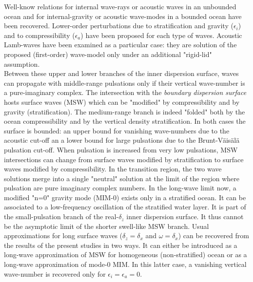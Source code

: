 \documentclass[a4paper,11pt]{article}
\begin{document}
Well-know relations for internal wave-rays or acoustic waves in an unbounded ocean and for internal-gravity or acoustic wave-modes in a bounded ocean have been recovered. Lower-order perturbations due to stratification and gravity ($\epsilon_i$) and to compressibility ($\epsilon_a$) have been proposed for each type of waves. Acoustic Lamb-waves have been examined as a particular case: they are solution of the proposed (first-order) wave-model only under an additional "rigid-lid" assumption.\\

Between these upper and lower branches of the inner dispersion surface, waves can propagate with middle-range pulsations only if their vertical wave-number is a pure-imaginary complex. The intersection with the \textit{boundary dispersion surface} hosts surface waves (MSW) which can be "modified" by compressibility and by gravity (stratification). The medium-range branch is indeed "folded" both by the ocean compressibility and by the vertical density stratification. In both cases the surface is bounded: an upper bound for vanishing wave-numbers due to the acoustic cut-off an a lower bound for large pulsations due to the Brunt-Väisälä pulsation cut-off. When pulsation is increased from very low pulsations, MSW intersections can change from surface waves modified by stratification to surface waves modified by compressibility. In the transition region, the two wave solutions merge into a single "neutral" solution at the limit of the region where pulsation are pure imaginary complex numbers.
In the long-wave limit now, a modified "n=0" gravity mode (MIM-0) exists only in a stratified ocean. It can be associated to a low-frequency oscillation of the stratified water layer. It is part of the small-pulsation branch of the real-$\delta_z$ inner dispersion surface. It thus cannot be the asymptotic limit of the shorter swell-like MSW branch. Usual approximations for long surface waves ($\delta_z=\delta_x$ and $\omega=\delta_x$) can be recovered from the results of the present studies in two ways. It can either be introduced as a long-wave approximation of MSW for homogeneous (non-stratified) ocean or as a long-wave approximation of mode-0 MIM. In this latter case, a vanishing vertical wave-number is recovered only for $\epsilon_i=\epsilon_a=0$.
\end{document}
